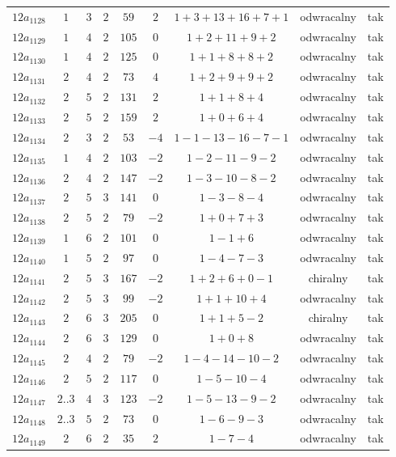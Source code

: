 \begin{longtable}{ccccccccc}
$12a_{1128}$ & $1$ & $3$ & $2$ & $59$ & $2$ & $1+3+13+16+7+1$ & odwracalny & tak \\
$12a_{1129}$ & $1$ & $4$ & $2$ & $105$ & $0$ & $1+2+11+9+2$ & odwracalny & tak \\
$12a_{1130}$ & $1$ & $4$ & $2$ & $125$ & $0$ & $1+1+8+8+2$ & odwracalny & tak \\
$12a_{1131}$ & $2$ & $4$ & $2$ & $73$ & $4$ & $1+2+9+9+2$ & odwracalny & tak \\
$12a_{1132}$ & $2$ & $5$ & $2$ & $131$ & $2$ & $1+1+8+4$ & odwracalny & tak \\
$12a_{1133}$ & $2$ & $5$ & $2$ & $159$ & $2$ & $1+0+6+4$ & odwracalny & tak \\
$12a_{1134}$ & $2$ & $3$ & $2$ & $53$ & $-4$ & $1-1-13-16-7-1$ & odwracalny & tak \\
$12a_{1135}$ & $1$ & $4$ & $2$ & $103$ & $-2$ & $1-2-11-9-2$ & odwracalny & tak \\
$12a_{1136}$ & $2$ & $4$ & $2$ & $147$ & $-2$ & $1-3-10-8-2$ & odwracalny & tak \\
$12a_{1137}$ & $2$ & $5$ & $3$ & $141$ & $0$ & $1-3-8-4$ & odwracalny & tak \\
$12a_{1138}$ & $2$ & $5$ & $2$ & $79$ & $-2$ & $1+0+7+3$ & odwracalny & tak \\
$12a_{1139}$ & $1$ & $6$ & $2$ & $101$ & $0$ & $1-1+6$ & odwracalny & tak \\
$12a_{1140}$ & $1$ & $5$ & $2$ & $97$ & $0$ & $1-4-7-3$ & odwracalny & tak \\
$12a_{1141}$ & $2$ & $5$ & $3$ & $167$ & $-2$ & $1+2+6+0-1$ & chiralny & tak \\
$12a_{1142}$ & $2$ & $5$ & $3$ & $99$ & $-2$ & $1+1+10+4$ & odwracalny & tak \\
$12a_{1143}$ & $2$ & $6$ & $3$ & $205$ & $0$ & $1+1+5-2$ & chiralny & tak \\
$12a_{1144}$ & $2$ & $6$ & $3$ & $129$ & $0$ & $1+0+8$ & odwracalny & tak \\
$12a_{1145}$ & $2$ & $4$ & $2$ & $79$ & $-2$ & $1-4-14-10-2$ & odwracalny & tak \\
$12a_{1146}$ & $2$ & $5$ & $2$ & $117$ & $0$ & $1-5-10-4$ & odwracalny & tak \\
$12a_{1147}$ & $2..3$ & $4$ & $3$ & $123$ & $-2$ & $1-5-13-9-2$ & odwracalny & tak \\
$12a_{1148}$ & $2..3$ & $5$ & $2$ & $73$ & $0$ & $1-6-9-3$ & odwracalny & tak \\
$12a_{1149}$ & $2$ & $6$ & $2$ & $35$ & $2$ & $1-7-4$ & odwracalny & tak \\

\end{longtable}
